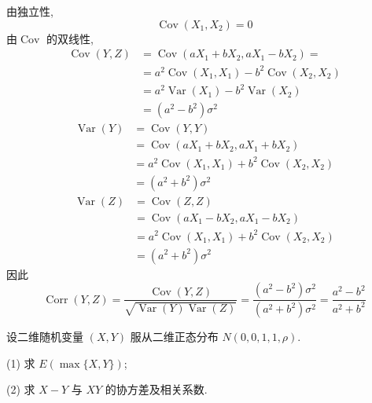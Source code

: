 \documentclass[../main.tex]{subfiles}
\begin{document}
\begin{solution}
    
由独立性,  \[
\operatorname{Cov}\left( X_1,X_2 \right)= 0 
\]
由\(  \operatorname{Cov}  \) 的双线性,  \[
\begin{aligned}
\operatorname{Cov}\left( Y,Z \right)&= \operatorname{Cov}\left( aX_1+ bX_2, aX_1-bX_2 \right)= \\ 
 &=  a^{2}\operatorname{Cov}\left( X_1,X_1 \right)-b^{2}\operatorname{Cov}\left( X_2,X_2 \right)\\ 
  &= a^{2}  \operatorname{Var}\left( X_1 \right)-b^{2}\operatorname{Var}\left( X_2 \right)\\ 
   &= \left( a^{2}-b^{2} \right) \sigma ^{2} 
\end{aligned}  
\] \[
\begin{aligned}
\operatorname{Var}\left( Y \right)&= \operatorname{Cov}\left( Y,Y \right)   \\ 
 &= \operatorname{Cov}\left( aX_1+ bX_2,aX_1+ bX_2 \right)\\ 
  &= a^{2} \operatorname{Cov}\left( X_1,X_1 \right)+ b^{2}\operatorname{Cov}\left( X_2,X_2 \right)\\ 
   &= \left( a^{2}+ b^{2} \right) \sigma ^{2}    
\end{aligned}
\] \[
\begin{aligned}
\operatorname{Var}\left( Z \right)&= \operatorname{Cov}\left( Z,Z \right)\\ 
 &=  \operatorname{Cov}\left( aX_1-bX_2,aX_1-bX_2 \right)\\ 
  &= a^{2}\operatorname{Cov}\left( X_1,X_1 \right) + b^{2}\operatorname{Cov}\left( X_2,X_2 \right)  \\ 
   &= \left( a^{2}+ b^{2} \right) \sigma ^{2}     
\end{aligned}
\]因此 \[
\operatorname{Corr}\left( Y,Z \right)= \frac{\operatorname{Cov}\left( Y,Z \right)  }{\sqrt{\operatorname{Var}\left( Y \right)\operatorname{Var}\left( Z \right)  } }= \frac{\left( a^{2}-b^{2} \right) \sigma ^{2}  }{\left( a^{2}+ b^{2} \right) \sigma ^{2}  }   = \frac{a^{2}-b^{2} }{a^{2}+ b^{2} } 
\]
\end{solution}


\begin{exercise}{}{}
设二维随机变量 $(X,Y)$ 服从二维正态分布 $N(0,0,1,1,\rho)$. 

(1) 求 $E(\max\{X,Y\})$;

(2) 求 $X-Y$ 与 $XY$ 的协方差及相关系数.
\end{exercise}
\end{document}
